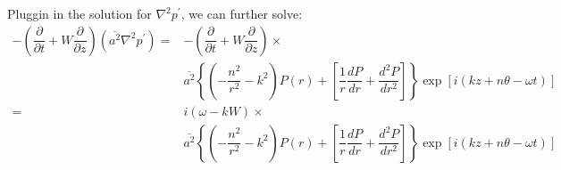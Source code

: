 \documentclass[onecolumn,10pt]{jhwhw}
\begin{document}
Pluggin in the solution for $\nabla^2 p^{\prime}$, we can further solve:
\begin{align*}
- \left ( \dfrac{\partial}{\partial t} + W \dfrac{\partial}{\partial z} \right) \left ( \overline{a^2} \nabla^2 p^{\prime} \right ) =& - \left ( \dfrac{\partial}{\partial t} + W \dfrac{\partial}{\partial z} \right) \times \\
& \overline{a^2} \left \{ \left ( -\dfrac{n^2}{r^2} -k^2 \right ) P(r) + \left [ \dfrac{1}{r} \dfrac{d P} {d r} + \dfrac{d^2 P} {d r^2} \right ] \right \} \exp[i(kz+n \theta - \omega t)] \\
=& i \left( \omega - k W \right) \times \\
& \overline{a^2} \left \{ \left ( -\dfrac{n^2}{r^2} -k^2 \right ) P(r) + \left [ \dfrac{1}{r} \dfrac{d P} {d r} + \dfrac{d^2 P} {d r^2} \right ] \right \} \exp[i(kz+n \theta - \omega t)] \\
\end{align*}
\end{document}
